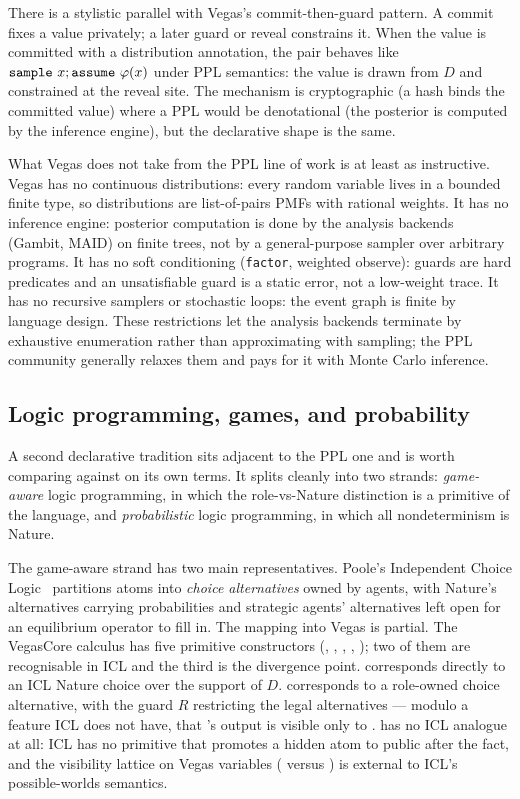 There is a stylistic parallel with Vegas's commit-then-guard
pattern.  A commit fixes a value privately; a later guard or
reveal constrains it.  When the value is committed with a
distribution annotation, the pair behaves like
\(\TT{sample}\ x; \TT{assume}\ \varphi(x)\) under PPL
semantics: the value is drawn from $D$ and constrained at the
reveal site.  The mechanism is cryptographic (a hash binds the
committed value) where a PPL would be denotational (the
posterior is computed by the inference engine), but the
declarative shape is the same.

What Vegas does not take from the PPL line of work is at least
as instructive.  Vegas has no continuous distributions: every
random variable lives in a bounded finite type, so distributions
are list-of-pairs PMFs with rational weights.  It has no
inference engine: posterior computation is done by the analysis
backends (Gambit, MAID) on finite trees, not by a general-purpose
sampler over arbitrary programs.  It has no soft conditioning
(\texttt{factor}, weighted observe): guards are hard predicates
and an unsatisfiable guard is a static error, not a low-weight
trace.  It has no recursive samplers or stochastic loops: the
event graph is finite by language design.  These restrictions
let the analysis backends terminate by exhaustive enumeration
rather than approximating with sampling; the PPL community
generally relaxes them and pays for it with Monte Carlo
inference.

\subsection{Logic programming, games, and probability}
\label{sec:related:lp}

A second declarative tradition sits adjacent to the PPL one and
is worth comparing against on its own terms.  It splits cleanly
into two strands: \emph{game-aware} logic programming, in which
the role-vs-Nature distinction is a primitive of the language,
and \emph{probabilistic} logic programming, in which all
nondeterminism is Nature.

The game-aware strand has two main representatives.  Poole's
Independent Choice Logic~\citep{Poole1997ICL} partitions atoms
into \emph{choice alternatives} owned by agents, with Nature's
alternatives carrying probabilities and strategic agents'
alternatives left open for an equilibrium operator to fill in.
The mapping into Vegas is partial.  The VegasCore calculus has
five primitive constructors (, , ,
, ); two of them are recognisable in ICL
and the third is the divergence point.  
corresponds directly to an ICL Nature choice over the support of
$D$.   corresponds to a role-owned
choice alternative, with the guard $R$ restricting the legal
alternatives --- modulo a feature ICL does not have, that
's output is visible only to .  
has no ICL analogue at all: ICL has no primitive that promotes a
hidden atom to public after the fact, and the visibility lattice
on Vegas variables ( versus ) is
external to ICL's possible-worlds semantics.

